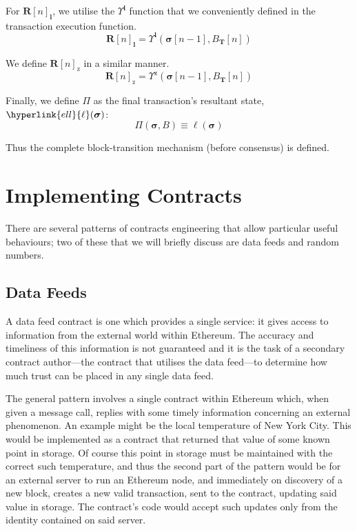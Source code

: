 \documentclass[9pt,oneside]{amsart}
\begin{document}
\begin{multicols}{2}
For $\mathbf{R}[n]_{\mathbf{l}}$, we utilise the \hyperlink{Upsilon_pow_l}{$\Upsilon^\mathbf{l}$} function that we conveniently defined in the transaction execution function.
\begin{equation}
\mathbf{R}[n]_{\mathbf{l}} =
\Upsilon^{\mathbf{l}}(\boldsymbol{\sigma}[n - 1], B_{\mathbf{T}}[n])
\end{equation}

We define \hyperlink{Upsilon_pow_z}{$\mathbf{R}[n]_{\mathrm{z}}$} in a similar manner.
\begin{equation}
\mathbf{R}[n]_{\mathrm{z}} =
\Upsilon^{\mathrm{z}}(\boldsymbol{\sigma}[n - 1], B_{\mathbf{T}}[n])
\end{equation}

\hypertarget{Pi}{}Finally, we define $\Pi$ as the final transaction's resultant state, $\hyperlink{ell}{\ell}(\boldsymbol{\sigma})$:
\begin{equation}
\Pi(\boldsymbol{\sigma}, B) \equiv \ell(\boldsymbol{\sigma})
\end{equation}

Thus the complete block-transition mechanism (before consensus) is defined.

\section{Implementing Contracts}

There are several patterns of contracts engineering that allow particular useful behaviours; two of these that we will briefly discuss are data feeds and random numbers.

\subsection{Data Feeds}
A data feed contract is one which provides a single service: it gives access to information from the external world within Ethereum. The accuracy and timeliness of this information is not guaranteed and it is the task of a secondary contract author---the contract that utilises the data feed---to determine how much trust can be placed in any single data feed.

The general pattern involves a single contract within Ethereum which, when given a message call, replies with some timely information concerning an external phenomenon. An example might be the local temperature of New York City. This would be implemented as a contract that returned that value of some known point in storage. Of course this point in storage must be maintained with the correct such temperature, and thus the second part of the pattern would be for an external server to run an Ethereum node, and immediately on discovery of a new block, creates a new valid transaction, sent to the contract, updating said value in storage. The contract's code would accept such updates only from the identity contained on said server.


\end{multicols}
\end{document}
